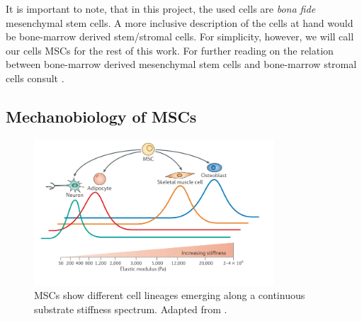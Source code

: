 It is important to note, that in this project, the used cells are \textit{bona fide} mesenchymal stem cells. A more inclusive description of the cells at hand would be bone-marrow derived stem/stromal cells. For simplicity, however, we will call our cells MSCs for the rest of this work. For further reading on the relation between bone-marrow derived mesenchymal stem cells and bone-marrow stromal cells consult \cite{Bianco2013}.

\subsection{Mechanobiology of MSCs}

\begin{figure}
	\centering
	\includegraphics[width = 0.8\textwidth]{STIFFNESS_DIFFERENTIATION.PNG}
	\caption{MSCs show different cell lineages emerging along a continuous substrate stiffness spectrum. Adapted from \cite{Halder2012}.}
	\label{fig:StiffDiff}
\end{figure}

